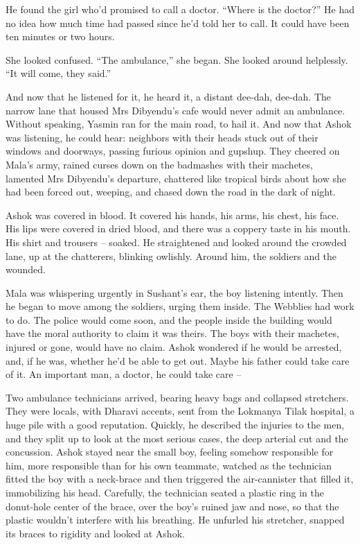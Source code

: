 He found the girl who'd promised to call a doctor. ``Where is the
doctor?'' He had no idea how much time had passed since he'd told
her to call. It could have been ten minutes or two hours.

She looked confused. ``The ambulance,'' she began. She looked around
helplessly. ``It will come, they said.''

And now that he listened for it, he heard it, a distant dee-dah,
dee-dah. The narrow lane that housed Mrs Dibyendu's cafe would
never admit an ambulance. Without speaking, Yasmin ran for the main
road, to hail it. And now that Ashok was listening, he could hear:
neighbors with their heads stuck out of their windows and doorways,
passing furious opinion and gupshup. They cheered on Mala's army,
rained curses down on the badmashes with their machetes, lamented
Mrs Dibyendu's departure, chattered like tropical birds about how
she had been forced out, weeping, and chased down the road in the
dark of night.

Ashok was covered in blood. It covered his hands, his arms, his
chest, his face. His lips were covered in dried blood, and there
was a coppery taste in his mouth. His shirt and trousers -- soaked.
He straightened and looked around the crowded lane, up at the
chatterers, blinking owlishly. Around him, the soldiers and the
wounded.

Mala was whispering urgently in Sushant's ear, the boy listening
intently. Then he began to move among the soldiers, urging them
inside. The Webblies had work to do. The police would come soon,
and the people inside the building would have the moral authority
to claim it was theirs. The boys with their machetes, injured or
gone, would have no claim. Ashok wondered if he would be arrested,
and, if he was, whether he'd be able to get out. Maybe his father
could take care of it. An important man, a doctor, he could take
care --

Two ambulance technicians arrived, bearing heavy bags and collapsed
stretchers. They were locals, with Dharavi accents, sent from the
Lokmanya Tilak hospital, a huge pile with a good reputation.
Quickly, he described the injuries to the men, and they split up to
look at the most serious cases, the deep arterial cut and the
concussion. Ashok stayed near the small boy, feeling somehow
responsible for him, more responsible than for his own teammate,
watched as the technician fitted the boy with a neck-brace and then
triggered the air-cannister that filled it, immobilizing his head.
Carefully, the technician seated a plastic ring in the donut-hole
center of the brace, over the boy's ruined jaw and nose, so that
the plastic wouldn't interfere with his breathing. He unfurled his
stretcher, snapped its braces to rigidity and looked at Ashok.


